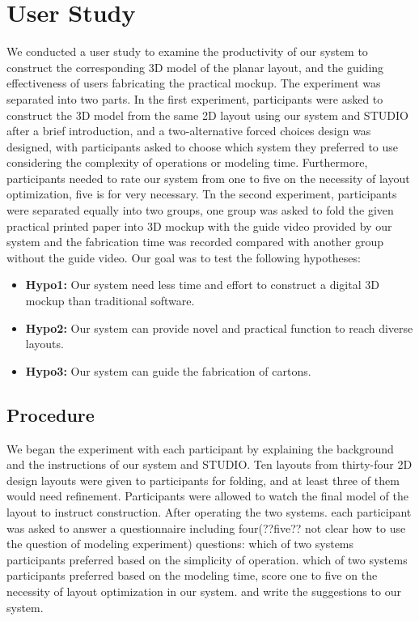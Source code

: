 \section{User Study}
We conducted a user study to examine the productivity of our system to construct the corresponding 3D model of the planar layout, and the guiding effectiveness of users fabricating the practical mockup. The experiment was separated into two parts. In the first experiment, participants were asked to construct the 3D model from the same 2D layout using our system and STUDIO after a brief introduction, and a two-alternative forced choices design was designed, with participants asked to choose which system they preferred to use considering the complexity of operations or modeling time. Furthermore, participants needed to rate our system from one to five on the necessity of layout optimization, five is for very necessary. Tn the second experiment, participants were separated equally into two groups, one group was asked to fold the given practical printed paper into 3D mockup with the guide video provided by our system and the fabrication time was recorded compared with another group without the guide video. Our goal was to test the following hypotheses:

\begin{itemize}
	\item \textbf{Hypo1:} Our system need less time and effort to construct a digital 3D mockup than traditional software.
	\item \textbf{Hypo2:} Our system can provide novel and practical function to reach diverse layouts.
	\item \textbf{Hypo3:} Our system can guide the fabrication of cartons.
\end{itemize}

\subsection{Procedure}
We began the experiment with each participant by explaining the background and the instructions of our system and STUDIO. Ten layouts from thirty-four 2D design layouts were given to participants for folding, and at least three of them would need refinement. Participants were allowed to watch the final model of the layout to instruct construction. After operating the two systems. each participant was asked to answer a questionnaire including four(??five?? not clear how to use the question of modeling experiment) questions: which of two systems participants preferred based on the simplicity of operation. which of two systems participants preferred based on the modeling time, score one to five on the necessity of layout optimization in our system. and write the suggestions to our system.

